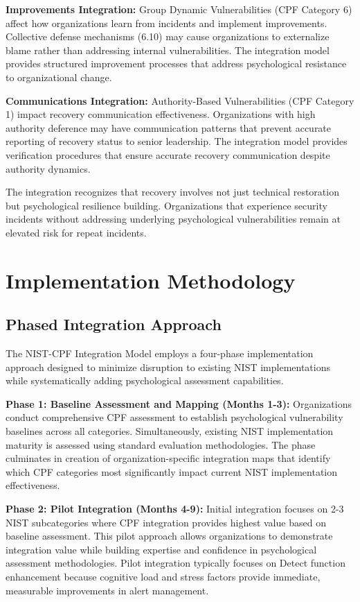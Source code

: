 \documentclass[10pt, twocolumn]{article}
\begin{document}
\textbf{Improvements Integration:} Group Dynamic Vulnerabilities (CPF Category 6) affect how organizations learn from incidents and implement improvements. Collective defense mechanisms (6.10) may cause organizations to externalize blame rather than addressing internal vulnerabilities. The integration model provides structured improvement processes that address psychological resistance to organizational change.

\textbf{Communications Integration:} Authority-Based Vulnerabilities (CPF Category 1) impact recovery communication effectiveness. Organizations with high authority deference may have communication patterns that prevent accurate reporting of recovery status to senior leadership. The integration model provides verification procedures that ensure accurate recovery communication despite authority dynamics.

The integration recognizes that recovery involves not just technical restoration but psychological resilience building. Organizations that experience security incidents without addressing underlying psychological vulnerabilities remain at elevated risk for repeat incidents.

\section{Implementation Methodology}

\subsection{Phased Integration Approach}

The NIST-CPF Integration Model employs a four-phase implementation approach designed to minimize disruption to existing NIST implementations while systematically adding psychological assessment capabilities.

\textbf{Phase 1: Baseline Assessment and Mapping (Months 1-3):} Organizations conduct comprehensive CPF assessment to establish psychological vulnerability baselines across all categories. Simultaneously, existing NIST implementation maturity is assessed using standard evaluation methodologies. The phase culminates in creation of organization-specific integration maps that identify which CPF categories most significantly impact current NIST implementation effectiveness.

\textbf{Phase 2: Pilot Integration (Months 4-9):} Initial integration focuses on 2-3 NIST subcategories where CPF integration provides highest value based on baseline assessment. This pilot approach allows organizations to demonstrate integration value while building expertise and confidence in psychological assessment methodologies. Pilot integration typically focuses on Detect function enhancement because cognitive load and stress factors provide immediate, measurable improvements in alert management.
\end{document}
